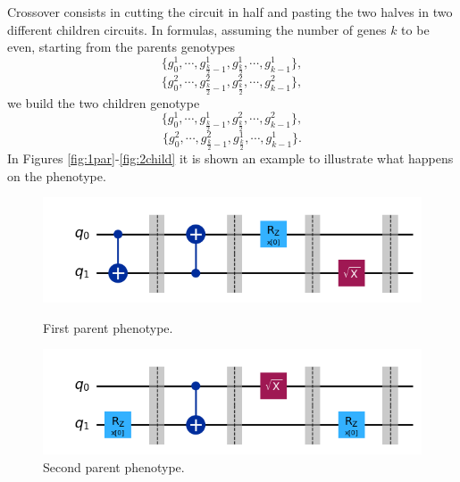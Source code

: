 \documentclass[12pt]{article}
\begin{document}
Crossover consists in cutting the circuit in half and pasting the two halves in two different children circuits. In formulas, assuming the number of genes $k$ to be even, starting from the parents genotypes $$\{g^1_0, \cdots , g^1_{\frac{k}{2}-1}, g^1_{\frac{k}{2}}, \cdots, g^1_{k-1}\},$$$$\{g^2_0, \cdots , g^2_{\frac{k}{2}-1}, g^2_{\frac{k}{2}}, \cdots, g^2_{k-1}\},$$ we build the two children genotype $$\{g^1_0, \cdots , g^1_{\frac{k}{2}-1}, g^2_{\frac{k}{2}}, \cdots, g^2_{k-1}\},$$$$\{g^2_0, \cdots , g^2_{\frac{k}{2}-1}, g^1_{\frac{k}{2}}, \cdots, g^1_{k-1}\}.$$
In Figures \ref{fig:1par}-\ref{fig:2child} it is shown an example to illustrate what happens on the phenotype. 
\begin{figure}[h!]
    \centering
    \begin{minipage}{0.7\textwidth}
        \centering
        \includegraphics[width=\linewidth]{images/parent1.png}
        \caption{First parent phenotype.}
        \label{fig:1par}
    \end{minipage}
    \hfill
    \begin{minipage}{0.7\textwidth}
        \centering
        \includegraphics[width=\linewidth]{images/parent2.png}
        \caption{Second parent phenotype.}
        \label{fig:2par}
    \end{minipage}

    \vspace{0.5cm}


\end{figure}
\end{document}
